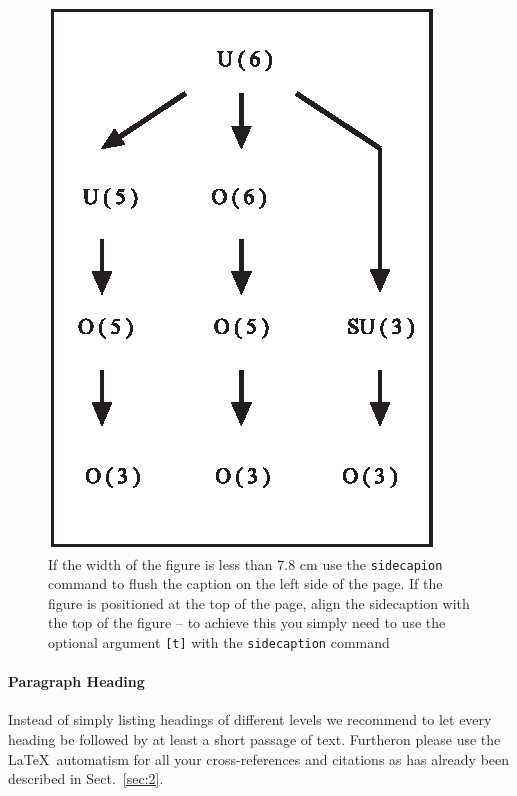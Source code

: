 \begin{figure}[b]

\includegraphics[scale=.65]{figure}
%
%
\caption{If the width of the figure is less than 7.8 cm use the \texttt{sidecapion} command to flush the caption on the left side of the page. If the figure is positioned at the top of the page, align the sidecaption with the top of the figure -- to achieve this you simply need to use the optional argument \texttt{[t]} with the \texttt{sidecaption} command}
\label{fig:12}       %

\end{figure}



\paragraph{Paragraph Heading} %
Instead of simply listing headings of different levels we recommend to let every heading be followed by at least a short passage of text. Furtheron please use the \LaTeX\ automatism for all your cross-references and citations as has already been described in Sect.~\ref{sec:2}.

